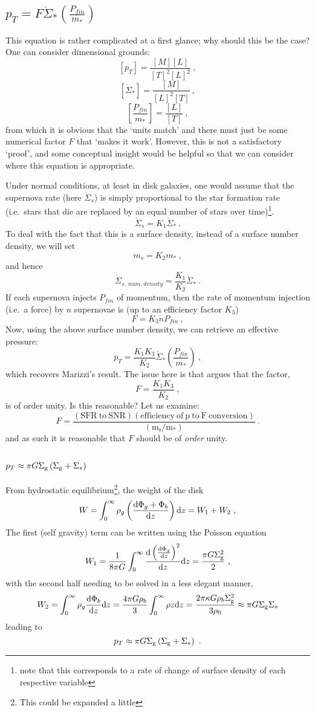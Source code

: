 \subsection{$p_T = F \dot{\Sigma}_*\left(\frac{P_{fin}}{m_*}\right)$}\label{proof-of-p_t-f-dotsigma_leftfracp_finm_right}

This equation is rather complicated at a first glance; why should this
be the case? One can consider dimensional grounds:
\[
    [p_T] = \frac{[M][L]}{[T]^2[L]^2}~,
\]
\[
    [\dot{\Sigma}_*] = \frac{[M]}{[L]^2[T]}~,
\]
\[
    \left[\frac{P_{fin}}{m_*}\right] = \frac{[L]}{[T]}~,
\]
from which it is obvious that the `units match' and there must just be
some numerical factor \(F\) that `makes it work'. However, this is not a
satisfactory `proof', and some conceptual insight would be helpful so
that we can consider where this equation is appropriate.

Under normal conditions, at least in disk galaxies, one would assume
that the supernova rate (here \(\dot{\Sigma}_s\)) is simply proportional
to the star formation rate (i.e.~stars that die are replaced by an equal
number of stars over time)\footnote{note that this corresponds to a rate
of change of surface density of each respective variable}.
\[
    \dot{\Sigma}_s = K_1 \dot{\Sigma}_*~.
\]
To deal with the fact that this is a surface density, instead of a
surface number density, we will set
\[
    m_s = K_2 m_*~,
\]
and hence
\[
    \dot{\Sigma}_{s, ~num. ~density} = \frac{K_1}{K_2} \dot{\Sigma}_*~.
\]
If each supernova injects \(P_{fin}\) of momentum, then the rate of
momentum injection (i.e.~a force) by \(n\) supernovae is (up to an
efficiency factor \(K_3\))
\[
    F = K_3\dot{n}P_{fin}~,
\]
Now, using the above surface number density, we can retrieve an effective
pressure:
\[
    p_T = \frac{K_1 K_3}{K_2} \dot{\Sigma}_* \left(\frac{P_{fin}}{m_*}\right)~,
\]
which recovers Marizzi's result. The issue here is that \citet{martizzi_supernova_2016}
argues that the factor,
\[
    F = \frac{K_1 K_3}{K_2}~,
\]
is of order unity. Is this reasonable? Let us examine:
\[
    F = \frac{(\mathrm{SFR ~to ~SNR}) (\mathrm{efficiency ~of ~p ~to ~F ~conversion})}{(\mathrm{m_s/m_*})}~.
\]
and as such it is reasonable that $F$ should be of \emph{order} unity.


\subsection{$p_T \approx \pi G \Sigma_\mathrm{g} \left(\Sigma_\mathrm{g} + \Sigma_*\right)$}

From hydrostatic equilibrium\footnote{This could be expanded a little}, the weight of the disk
$$
	W = \int^\infty_0 \rho_g \left(\frac{\mathrm{d}\Phi_g + \Phi_b}{\mathrm{d}z}\right) \mathrm{d}z = W_1 + W_2~,
$$
The first (self gravity) term can be written using the Poisson equation
$$
	W_1 = \frac{1}{8\pi G}\int^\infty_0 \frac{\mathrm{d}\left(\frac{\mathrm{d}\Phi_g}{\mathrm{d}z}\right)^2}{\mathrm{d}z} \mathrm{d} z = \frac{\pi G \Sigma_\mathrm{g}^2}{2}~,
$$
with the second half needing to be solved in a less elegant manner,
$$
	W_2 = \int^\infty_0 \rho_g \frac{\mathrm{d}\Phi_b}{\mathrm{d}z}\mathrm{d}z = \frac{4\pi G \rho_b}{3} \int^\infty_0 \rho z \mathrm{d}z = \frac{2 \pi \kappa G \rho_b \Sigma_\mathrm{g}^2}{3 \rho_0} \approx \pi G \Sigma_\mathrm{g} \Sigma_*
$$
leading to
$$
	p_T \approx \pi G \Sigma_\mathrm{g}\left(\Sigma_\mathrm{g} + \Sigma_*\right)~.
$$



